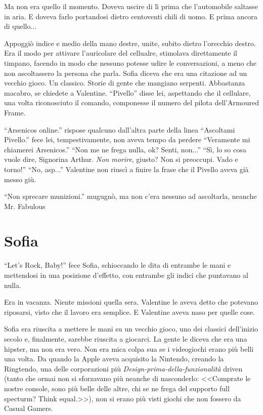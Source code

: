     Ma non era quello il momento. Doveva uscire di lì prima che
    l'automobile saltasse in aria. E doveva farlo portandosi dietro
    centoventi chili di uomo. E prima ancora di quello...

    Appoggiò indice e medio della mano destre, unite, subito dietro
    l'orecchio destro. Era il modo per attivare l'auricolare del cellualre,
    stimolava direttamente il timpano, facendo in modo che nessuno potesse
    udire le conversazioni, a meno che non ascoltassero la persona che
    parla. Sofia diceva che era una citazione ad un vecchio gioco. Un
    classico. Storie di gente che mangiano serpenti. Abbastanza macabro, se
    chiedete a Valentine. ``Pivello'' disse lei, aspettando che il
    cellulare, una volta riconosciuto il comando, componesse il numero del
    pilota dell'Armoured Frame.

    ``Arsenicos online.'' rispose qualcuno dall'altra parte della linea
    ``Ascoltami Pivello.'' fece lei, tempestivamente, non aveva tempo da
    perdere ``Veramente mi chiamerei Arsenicos.'' ``Non me ne frega nulla,
    ok? Senti, non...'' ``Sì, lo so cosa vuole dire, Signorina Arthur.
    \emph{Non morire}, giusto? Non si preoccupi. Vado e torno!'' ``No,
    asp...'' Valentine non riuscì a finire la frase che il Pivello aveva
    già messo giù.

    ``Non sprecare munizioni.'' mugugnò, ma non c'era nessuno ad
    ascoltarla, neanche Mr. Fabulous

  \section*{Sofia}

    ``Let's Rock, Baby!'' fece Sofia, schioccando le dita di entrambe le
    mani e mettendosi in una posizione d'effetto, con entrambe gli indici
    che puntavano al nulla.

    Era in vacanza. Niente missioni quella sera. Valentine le aveva detto
    che potevano riposarsi, visto che il lavoro era semplice. E Valentine
    aveva naso per quelle cose.

    Sofia era riuscita a mettere le mani su un vecchio gioco, uno dei
    classici dell'inizio secolo e, finalmente, sarebbe riuscita a
    giocarci. La gente le diceva che era una hipster, ma non era vero. Non
    era mica colpa sua se i videogiochi erano più belli una volta. Da
    quando la Apple aveva acquisito la Nintendo, creando la Ringtendo, una delle
    corporazioni più \emph{Design-prima-della-funzionalità} driven (tanto
    che ormai non si sforzavano più neanche di nasconderlo: <<Comprate le
    nostre console, sono più belle delle altre, chi se ne frega del
    supporto full specturm? Think equal.>>), non si erano più visti giochi
    che non fossero da Casual Gamers.

